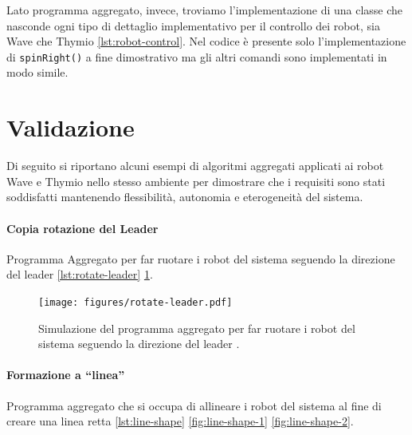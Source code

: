 \documentclass[12pt,a4paper,openright,twoside]{book}
\begin{document}
Lato programma aggregato, invece, troviamo l'implementazione di una classe che nasconde ogni tipo di dettaglio implementativo per il controllo dei robot, sia Wave che Thymio \cref{lst:robot-control}. Nel codice è presente solo l'implementazione di \verb|spinRight()| a fine dimostrativo ma gli altri comandi sono implementati in modo simile.



\section{Validazione}

Di seguito si riportano alcuni esempi di algoritmi aggregati applicati ai robot Wave e Thymio nello stesso ambiente per dimostrare che i requisiti sono stati soddisfatti mantenendo flessibilità, autonomia e eterogeneità del sistema.

\paragraph{Copia rotazione del Leader}
Programma Aggregato per far ruotare i robot del sistema seguendo la direzione del leader \cref{lst:rotate-leader} \cref{fig:rotate-leader}.



\begin{figure}
    \centering
    \texttt{[image: figures/rotate-leader.pdf]}
    \caption{Simulazione del programma aggregato per far ruotare i robot del sistema seguendo la direzione del leader .}
    \label{fig:rotate-leader}
\end{figure}

\paragraph{Formazione a ``linea''}
Programma aggregato che si occupa di allineare i robot del sistema al fine di creare una linea retta \cref{lst:line-shape} \cref{fig:line-shape-1} \cref{fig:line-shape-2}.

% 
\end{document}
